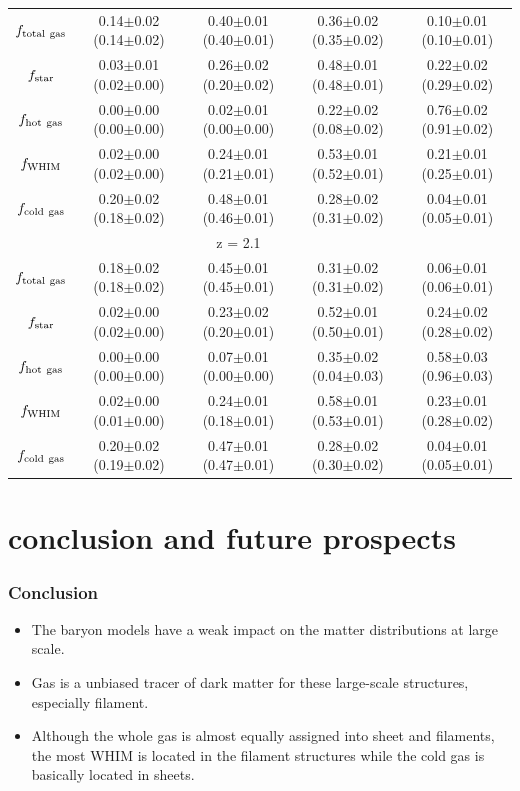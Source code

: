 \documentclass[aspectratio=169]{beamer}
\begin{document}
\begin{frame}[plain,t]
\begin{table}
\begin{tabular}{c|c|c|c|c}
      \hline
    $f_{\rm total\ gas}$ & 0.14$\pm$0.02 (0.14$\pm$0.02) & 0.40$\pm$0.01 (0.40$\pm$0.01) & 0.36$\pm$0.02 (0.35$\pm$0.02) & 0.10$\pm$0.01 (0.10$\pm$0.01) \\
    $f_{\rm star}$       & 0.03$\pm$0.01 (0.02$\pm$0.00) & 0.26$\pm$0.02 (0.20$\pm$0.02) & 0.48$\pm$0.01 (0.48$\pm$0.01) & 0.22$\pm$0.02 (0.29$\pm$0.02) \\
    $f_{\rm hot\ gas}$   & 0.00$\pm$0.00 (0.00$\pm$0.00) & 0.02$\pm$0.01 (0.00$\pm$0.00) & 0.22$\pm$0.02 (0.08$\pm$0.02) & 0.76$\pm$0.02 (0.91$\pm$0.02)\\
    \alert{$f_{\rm WHIM}$}       & 0.02$\pm$0.00 (0.02$\pm$0.00) & 0.24$\pm$0.01 (0.21$\pm$0.01) & \alert{0.53}$\pm$0.01 (0.52$\pm$0.01) & 0.21$\pm$0.01 (0.25$\pm$0.01) \\
    $f_{\rm cold\ gas}$  & 0.20$\pm$0.02 (0.18$\pm$0.02) & 0.48$\pm$0.01 (0.46$\pm$0.01) & 0.28$\pm$0.02 (0.31$\pm$0.02) & 0.04$\pm$0.01 (0.05$\pm$0.01) \\
    \hline
      & & z = 2.1 & & \\
      \hline
    $f_{\rm total\ gas}$ & 0.18$\pm$0.02 (0.18$\pm$0.02) & 0.45$\pm$0.01 (0.45$\pm$0.01) & 0.31$\pm$0.02 (0.31$\pm$0.02) & 0.06$\pm$0.01 (0.06$\pm$0.01) \\
    $f_{\rm star}$       & 0.02$\pm$0.00 (0.02$\pm$0.00) & 0.23$\pm$0.02 (0.20$\pm$0.01) & 0.52$\pm$0.01 (0.50$\pm$0.01) & 0.24$\pm$0.02 (0.28$\pm$0.02) \\
    $f_{\rm hot\ gas}$   & 0.00$\pm$0.00 (0.00$\pm$0.00) & 0.07$\pm$0.01 (0.00$\pm$0.00) & 0.35$\pm$0.02 (0.04$\pm$0.03) & 0.58$\pm$0.03 (0.96$\pm$0.03) \\
    \alert{$f_{\rm WHIM}$}      & 0.02$\pm$0.00 (0.01$\pm$0.00) & 0.24$\pm$0.01 (0.18$\pm$0.01) & \alert{0.58}$\pm$0.01 (0.53$\pm$0.01) & 0.23$\pm$0.01 (0.28$\pm$0.02) \\
    $f_{\rm cold\ gas}$  & 0.20$\pm$0.02 (0.19$\pm$0.02) & 0.47$\pm$0.01 (0.47$\pm$0.01) & 0.28$\pm$0.02 (0.30$\pm$0.02) & 0.04$\pm$0.01 (0.05$\pm$0.01) \\
    \hline
  \end{tabular}
\end{table}
\end{frame}

\section{conclusion and future prospects}
\begin{frame}
  \frametitle{Conclusion}
  {\Large
  \begin{itemize}
    \item The baryon models have a weak impact on the matter distributions at large scale.
    \item Gas is a unbiased tracer of dark matter for these large-scale structures, especially filament.
    \item Although the whole gas is almost equally assigned into sheet and filaments, the most WHIM is located in the filament structures while the cold gas is basically located in sheets.
  \end{itemize}}
\end{frame}
\end{document}
